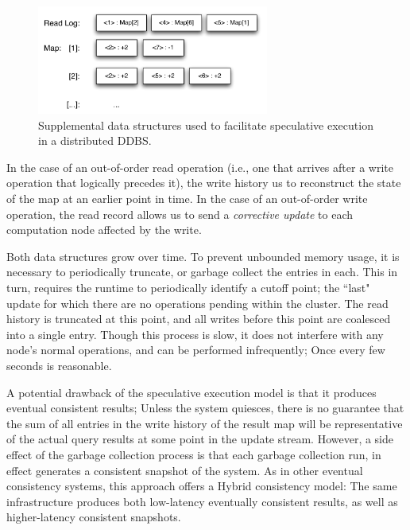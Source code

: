 \begin{figure}
\begin{center}
\includegraphics[width=3.0in]{graphics/speculative_storage}
\end{center}
\caption{Supplemental data structures used to facilitate speculative execution in a distributed DDBS.}
\label{fig:speculativeStorage}
\end{figure}

In the case of an out-of-order read operation (i.e., one that arrives after a write operation that logically precedes it), the write history us to reconstruct the state of the map at an earlier point in time.  In the case of an out-of-order write operation, the read record allows us to send a \textit{corrective update} to each computation node affected by the write.

Both data structures grow over time.  To prevent unbounded memory usage, it is necessary to periodically truncate, or garbage collect the entries in each.  This in turn, requires the runtime to periodically identify a cutoff point; the ``last" update for which there are no operations pending within the cluster.  The read history is truncated at this point, and all writes before this point are coalesced into a single entry.  Though this process is slow, it does not interfere with any node's normal operations, and can be performed infrequently; Once every few seconds is reasonable.

A potential drawback of the speculative execution model is that it produces eventual consistent results; Unless the system quiesces, there is no guarantee that the sum of all entries in the write history of the result map will be representative of the actual query results at some point in the update stream.  However, a side effect of the garbage collection process is that each garbage collection run, in effect generates a consistent snapshot of the system.  As in other eventual consistency systems\cite{bayou}, this approach offers a Hybrid consistency model: The same infrastructure produces both low-latency eventually consistent results, as well as higher-latency consistent snapshots.

